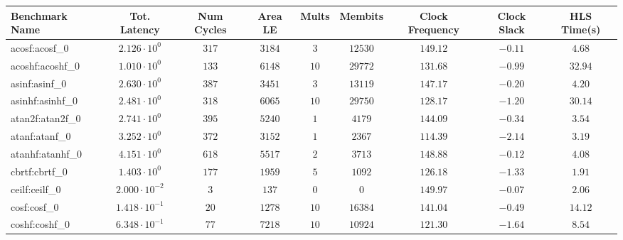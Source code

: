 \begin{tabular}{|l|c|c|c|c|c|c|c|c|}
\hline
Benchmark Name               & Tot. Latency            & Num Cycles & Area LE    & Mults   & Membits    & Clock Frequency & Clock Slack & HLS Time(s) \\
\hline
acosf:acosf\_0               & $ 2.126 \cdot 10^{0}  $ & $ 317    $ & $ 3184   $ & $ 3   $ & $ 12530  $ & $ 149.12      $ & $ -0.11   $ & $ 4.68    $ \\
acoshf:acoshf\_0             & $ 1.010 \cdot 10^{0}  $ & $ 133    $ & $ 6148   $ & $ 10  $ & $ 29772  $ & $ 131.68      $ & $ -0.99   $ & $ 32.94   $ \\
asinf:asinf\_0               & $ 2.630 \cdot 10^{0}  $ & $ 387    $ & $ 3451   $ & $ 3   $ & $ 13119  $ & $ 147.17      $ & $ -0.20   $ & $ 4.20    $ \\
asinhf:asinhf\_0             & $ 2.481 \cdot 10^{0}  $ & $ 318    $ & $ 6065   $ & $ 10  $ & $ 29750  $ & $ 128.17      $ & $ -1.20   $ & $ 30.14   $ \\
atan2f:atan2f\_0             & $ 2.741 \cdot 10^{0}  $ & $ 395    $ & $ 5240   $ & $ 1   $ & $ 4179   $ & $ 144.09      $ & $ -0.34   $ & $ 3.54    $ \\
atanf:atanf\_0               & $ 3.252 \cdot 10^{0}  $ & $ 372    $ & $ 3152   $ & $ 1   $ & $ 2367   $ & $ 114.39      $ & $ -2.14   $ & $ 3.19    $ \\
atanhf:atanhf\_0             & $ 4.151 \cdot 10^{0}  $ & $ 618    $ & $ 5517   $ & $ 2   $ & $ 3713   $ & $ 148.88      $ & $ -0.12   $ & $ 4.08    $ \\
cbrtf:cbrtf\_0               & $ 1.403 \cdot 10^{0}  $ & $ 177    $ & $ 1959   $ & $ 5   $ & $ 1092   $ & $ 126.18      $ & $ -1.33   $ & $ 1.91    $ \\
ceilf:ceilf\_0               & $ 2.000 \cdot 10^{-2} $ & $ 3      $ & $ 137    $ & $ 0   $ & $ 0      $ & $ 149.97      $ & $ -0.07   $ & $ 2.06    $ \\
cosf:cosf\_0                 & $ 1.418 \cdot 10^{-1} $ & $ 20     $ & $ 1278   $ & $ 10  $ & $ 16384  $ & $ 141.04      $ & $ -0.49   $ & $ 14.12   $ \\
coshf:coshf\_0               & $ 6.348 \cdot 10^{-1} $ & $ 77     $ & $ 7218   $ & $ 10  $ & $ 10924  $ & $ 121.30      $ & $ -1.64   $ & $ 8.54    $ \\

\end{tabular}
